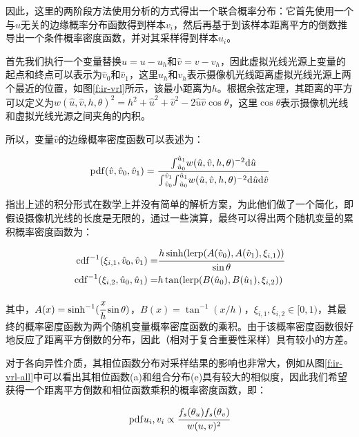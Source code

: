 因此，这里的两阶段方法使用分析的方式得出一个联合概率分布：它首先使用一个与$u$无关的边缘概率分布函数得到样本$v_i$，然后再基于到该样本距离平方的倒数推导出一个条件概率密度函数，并对其采样得到样本$u_i$。

首先我们执行一个变量替换$\hat{u}=u-u_h$和$\hat{v}=v-v_h$，因此虚拟光线光源上变量的起点和终点可以表示为$\hat{v}_0$和$\hat{v}_1$，这里$u_h$和$v_h$表示摄像机光线距离虚拟光线光源上两个最近的位置，如图\ref{f:ir-vrl}所示，该最小距离为$h$。根据余弦定理，其距离的平方可以定义为$w(\hat{u},\hat{v},h,\theta)^{2}=h^{2}+\hat{u}^{2}+\hat{v}^{2}-2\hat{u}\hat{v}\cos\theta$，这里$\cos\theta$表示摄像机光线和虚拟光线光源之间夹角的内积。

所以，变量$\hat{v}$的边缘概率密度函数可以表述为：

\begin{equation}
	{\rm pdf}(\hat{v},\hat{v}_0,\hat{v}_1)= \cfrac{{\rm \int}^{\hat{u}_1}_{\hat{u}_0} w(\hat{u},\hat{v},h,\theta)^{-2}{\rm d}\hat{u}}{{\rm \int}^{\hat{v}_1}_{\hat{v}_0}{\rm \int}^{\hat{u}_1}_{\hat{u}_0} w(\hat{u},\hat{v},h,\theta)^{-2}{\rm d}\hat{u}{\rm d}\hat{v}}
\end{equation}

\cite{a:VirtualRayLightsforRenderingSceneswithParticipatingMedia}指出上述的积分形式在数学上并没有简单的解析方案，为此他们做了一个简化，即假设摄像机光线的长度是无限的，通过一些演算，最终可以得出两个随机变量的累积概率密度函数为：

\begin{equation}
\begin{aligned}
	{\rm cdf}^{-1}(\xi_{i,1},\hat{v}_0,\hat{v}_1)=& \cfrac{h\sinh(\text{lerp}(A(\hat{v}_0),A(\hat{v}_1),\xi_{i,1}))}{\sin\theta}\\
	{\rm cdf}^{-1}(\xi_{i,2},\hat{u}_0,\hat{u}_1)=&h\tan(\text{lerp}(B(\hat{u}_0),B(\hat{u}_1),\xi_{i,2}))
\end{aligned}	
\end{equation}

\noindent 其中，$A(x)=\sinh^{-1}( \cfrac{x}{h}\sin\theta)$，$B(x)=\tan^{-1}(x/h)$，$\xi_{i,1},\xi_{i,2}\in[0,1)$，其最终的概率密度函数为两个随机变量概率密度函数的乘积。由于该概率密度函数很好地反应了距离平方倒数的分布，因此（相对于复合重要性采样）具有较小的方差。

对于各向异性介质，其相位函数分布对采样结果的影响也非常大，例如从图\ref{f:ir-vrl-all}中可以看出其相位函数(a)和组合分布(e)具有较大的相似度，因此我们希望获得一个距离平方倒数和相位函数乘积的概率密度函数，即：

\begin{equation}
	{\rm pdf}{u_i,v_i}\propto \cfrac{f_s(\theta_u)f_s(\theta_v)}{w(u,v)^{2}}
\end{equation}

